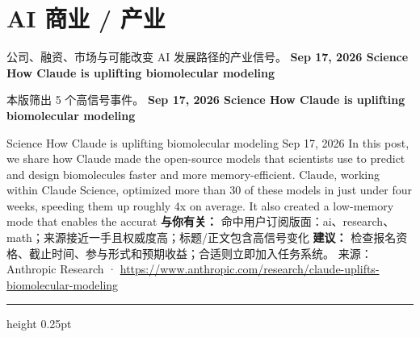 \documentclass[10.5pt]{ctexart}
\begin{document}
\section*{AI 商业 / 产业}
{\color{ormuted} 公司、融资、市场与可能改变 AI 发展路径的产业信号。}
\vspace{2mm}
{\LARGE\bfseries Sep 17, 2026 Science How Claude is uplifting biomolecular modeling}\par
\vspace{1mm}
{\color{ormuted} 本版筛出 5 个高信号事件。}
\vspace{3mm}
{\Large\bfseries Sep 17, 2026 Science How Claude is uplifting biomolecular modeling}\par
Science How Claude is uplifting biomolecular modeling Sep 17, 2026 In this post, we share how Claude made the open-source models that scientists use to predict and design biomolecules faster and more memory-efficient. Claude, working within Claude Science, optimized more than 30 of these models in just under four weeks, speeding them up roughly 4x on average. It also created a low-memory mode that enables the accurat
\textbf{与你有关：} 命中用户订阅版面：ai、research、math；来源接近一手且权威度高；标题/正文包含高信号变化
\textbf{建议：} 检查报名资格、截止时间、参与形式和预期收益；合适则立即加入任务系统。
{\footnotesize\color{ormuted} 来源：Anthropic Research · \url{https://www.anthropic.com/research/claude-uplifts-biomolecular-modeling}}
\vspace{4mm}
\hrule height 0.25pt
\vspace{3mm}
\end{document}
